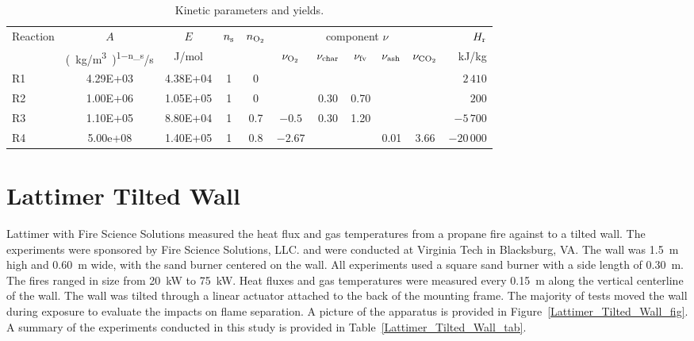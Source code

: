 \begin{table}[h]
\begin{center}
\caption{Kinetic parameters and yields.}
\small
\renewcommand{\arraystretch}{1.2}
\begin{tabular}{lcccccccccr}
\hline
Reaction  & $A$ & $E$ & $n_{\rm s}$ & $n_{{\rm O}_2}$ & \multicolumn{5}{c}{component $\nu$} & $H_{\rm r}$ \\
 \cmidrule(rl){6-10}
  & \si{(kg/m^3)^{1-n_s}/s} & J/mol & & & $\nu_{{\rm O}_2}$ & $\nu_{\rm char}$ & $\nu_{\rm fv}$ & $\nu_{\rm ash}$ & $\nu_{{\rm C}{\rm O}_2}$ & kJ/kg\\
\hline
R1  & 4.29E+03 & 4.38E+04 & 1  & 0    &          &       &       &      &      & $2\,410$   \\
R2  & 1.00E+06 & 1.05E+05 & 1  & 0    &          & 0.30  & 0.70  &      &      & $200$      \\
R3  & 1.10E+05 & 8.80E+04 & 1  & 0.7  & $-0.5$   & 0.30  & 1.20  &      &      & $-5\,700$  \\
R4  & 5.00e+08 & 1.40E+05 & 1  & 0.8  & $-2.67$  &       &       & 0.01 & 3.66 & $-20\,000$ \\
\hline
\end{tabular}
\label{tab:m1_kinetics}
\end{center}
\end{table}


\section{Lattimer Tilted Wall}
\label{Lattimer_Tilted_Wall_Description}

Lattimer with Fire Science Solutions measured the heat flux and gas temperatures from a propane fire against to a tilted wall.
The experiments were sponsored by Fire Science Solutions, LLC. and were conducted at Virginia Tech in Blacksburg, VA.
The wall was 1.5~m high and 0.60~m wide, with the sand burner centered on the wall.
All experiments used a square sand burner with a side length of 0.30~m.
The fires ranged in size from 20~kW to 75~kW.
Heat fluxes and gas temperatures were measured every 0.15~m along the vertical centerline of the wall.
The wall was tilted through a linear actuator attached to the back of the mounting frame.
The majority of tests moved the wall during exposure to evaluate the impacts on flame separation.
A picture of the apparatus is provided in Figure~\ref{Lattimer_Tilted_Wall_fig}.
A summary of the experiments conducted in this study is provided in Table~\ref{Lattimer_Tilted_Wall_tab}.

